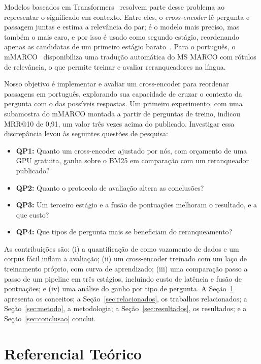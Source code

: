 \documentclass[12pt]{article}
\begin{document}
Modelos baseados em Transformers~\cite{vaswani:2017} resolvem parte desse problema ao
representar o significado em contexto. Entre eles, o \emph{cross-encoder} lê pergunta e
passagem juntas e estima a relevância do par; é o modelo mais preciso, mas também o mais
caro, e por isso é usado como segundo estágio, reordenando apenas as candidatas de um
primeiro estágio barato~\cite{nogueira:2019,nogueira:2019multistage}. Para o português, o
mMARCO~\cite{bonifacio:2021} disponibiliza uma tradução automática do MS
MARCO com rótulos de relevância, o que permite treinar e avaliar
reranqueadores na língua.

Nosso objetivo é implementar e avaliar um cross-encoder para reordenar passagens em
português, explorando sua capacidade de cruzar o contexto da pergunta com o das possíveis
respostas. Um primeiro experimento, com uma subamostra do mMARCO montada a partir de
perguntas de treino, indicou MRR@10 de 0,91, um valor três vezes acima do publicado. Investigar
essa discrepância levou às seguintes questões de pesquisa:

\begin{itemize}
  \item \textbf{QP1:} Quanto um cross-encoder ajustado por nós, com orçamento de uma GPU
  gratuita, ganha sobre o BM25 em comparação com um reranqueador publicado?
  \item \textbf{QP2:} Quanto o protocolo de avaliação altera as conclusões?
  \item \textbf{QP3:} Um terceiro estágio e a fusão de pontuações melhoram o resultado, e a
  que custo?
  \item \textbf{QP4:} Que tipos de pergunta mais se beneficiam do reranqueamento?
\end{itemize}

As contribuições são: (i) a quantificação de como vazamento de dados e um corpus fácil
inflam a avaliação; (ii) um cross-encoder treinado com um laço de treinamento próprio, com
curva de aprendizado; (iii) uma comparação passo a passo de um pipeline em três estágios,
incluindo custo de latência e fusão de pontuações; e (iv) uma análise do ganho por tipo de
pergunta. A Seção~\ref{sec:teoria} apresenta os conceitos; a Seção~\ref{sec:relacionados},
os trabalhos relacionados; a Seção~\ref{sec:metodo}, a metodologia; a
Seção~\ref{sec:resultados}, os resultados; e a Seção~\ref{sec:conclusao} conclui.

\section{Referencial Teórico}
\label{sec:teoria}
\end{document}
